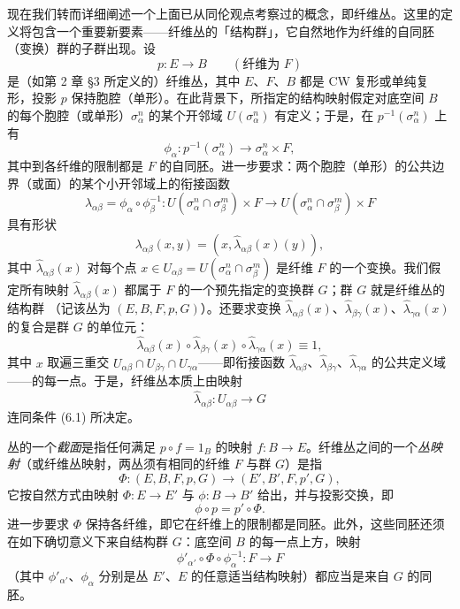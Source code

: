现在我们转而详细阐述一个上面已从同伦观点考察过的概念，即纤维丛。这里的定义将包含一个重要新要素——纤维丛的「结构群」，它自然地作为纤维的自同胚（变换）群的子群出现。设
\[
p:E\longrightarrow B\qquad(\text{纤维为 }F)
\]
是（如第 2 章 §3 所定义的）纤维丛，其中 $E$、$F$、$B$ 都是 CW 复形或单纯复形，投影 $p$ 保持胞腔（单形）。在此背景下，所指定的结构映射假定对底空间 $B$ 的每个胞腔（或单形）$\sigma^n_\alpha$ 的某个开邻域 $U(\sigma^n_\alpha)$ 有定义；于是，在 $p^{-1}(\sigma^n_\alpha)$ 上有
\[
\phi_\alpha:p^{-1}(\sigma^n_\alpha)\longrightarrow\sigma^n_\alpha\times F,
\]
其中到各纤维的限制都是 $F$ 的自同胚。进一步要求：两个胞腔（单形）的公共边界（或面）的某个小开邻域上的衔接函数
\[
\lambda_{\alpha\beta}=\phi_\alpha\circ\phi_\beta^{-1}:U(\sigma^n_\alpha\cap\sigma^m_\beta)\times F\longrightarrow U(\sigma^n_\alpha\cap\sigma^m_\beta)\times F
\]
具有形状
\[
\lambda_{\alpha\beta}(x,y)=(x,\hat\lambda_{\alpha\beta}(x)(y)),
\]
其中 $\hat\lambda_{\alpha\beta}(x)$ 对每个点 $x\in U_{\alpha\beta}=U(\sigma^n_\alpha\cap\sigma^m_\beta)$ 是纤维 $F$ 的一个变换。我们假定所有映射 $\hat\lambda_{\alpha\beta}(x)$ 都属于 $F$ 的一个预先指定的变换群 $G$；群 $G$ 就是纤维丛的结构群
（记该丛为 $(E,B,F,p,G)$）。还要求变换 $\hat\lambda_{\alpha\beta}(x)$、$\hat\lambda_{\beta\gamma}(x)$、$\hat\lambda_{\gamma\alpha}(x)$ 的复合是群 $G$ 的单位元：
\begin{equation}
\hat\lambda_{\alpha\beta}(x)\circ\hat\lambda_{\beta\gamma}(x)\circ\hat\lambda_{\gamma\alpha}(x)\equiv 1, \tag{6.1}
\end{equation}
其中 $x$ 取遍三重交 $U_{\alpha\beta}\cap U_{\beta\gamma}\cap U_{\gamma\alpha}$——即衔接函数 $\hat\lambda_{\alpha\beta}$、$\hat\lambda_{\beta\gamma}$、$\hat\lambda_{\gamma\alpha}$ 的公共定义域——的每一点。于是，纤维丛本质上由映射
\begin{equation}
\hat\lambda_{\alpha\beta}:U_{\alpha\beta}\longrightarrow G \tag{6.2}
\end{equation}
连同条件 (6.1) 所决定。


丛的一个\emph{截面}是指任何满足 $p\circ f=1_B$ 的映射 $f:B\to E$。纤维丛之间的一个\emph{丛映射}（或纤维丛映射，两丛须有相同的纤维 $F$ 与群 $G$）是指
\[
\Phi:(E,B,F,p,G)\longrightarrow(E',B',F,p',G),
\]
它按自然方式由映射 $\Phi:E\to E'$ 与 $\phi:B\to B'$ 给出，并与投影交换，即
\[
\phi\circ p=p'\circ\Phi.
\]
进一步要求 $\Phi$ 保持各纤维，即它在纤维上的限制都是同胚。此外，这些同胚还须在如下确切意义下来自结构群 $G$：底空间 $B$ 的每一点上方，映射
\[
\phi'_{\alpha'}\circ\Phi\circ\phi_\alpha^{-1}:F\longrightarrow F
\]
（其中 $\phi'_{\alpha'}$、$\phi_\alpha$ 分别是丛 $E'$、$E$ 的任意适当结构映射）都应当是来自 $G$ 的同胚。

